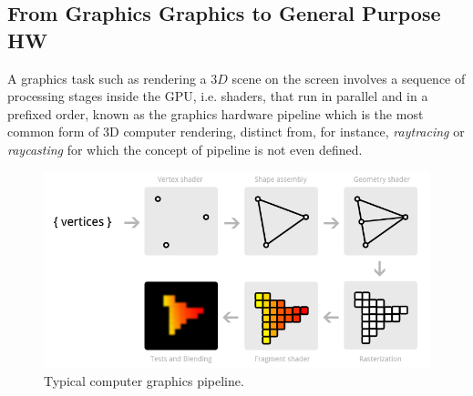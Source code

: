 \begin{description}
    \subsection{From Graphics Graphics to General Purpose HW}\label{graphicPipeline}
    A graphics task such as rendering a $3D$ scene on the screen
    involves a sequence of processing stages inside the GPU, i.e. shaders, that run in parallel and in a prefixed order, known as the graphics hardware
    pipeline \cite{Shirley:2005:FCG:1088893} which is the most common form of 3D computer rendering, distinct from, for instance, \textit{raytracing} or \textit{raycasting} for which the concept of pipeline is not even defined.
     \begin{figure}[H]
    	\centering
    	\caption{Typical computer graphics pipeline.}\label{graphicPipeline}
    	\includegraphics[width=1.0\textwidth]{./images/parallel_programming/pipeline}
    \end{figure}
    

\end{description}
